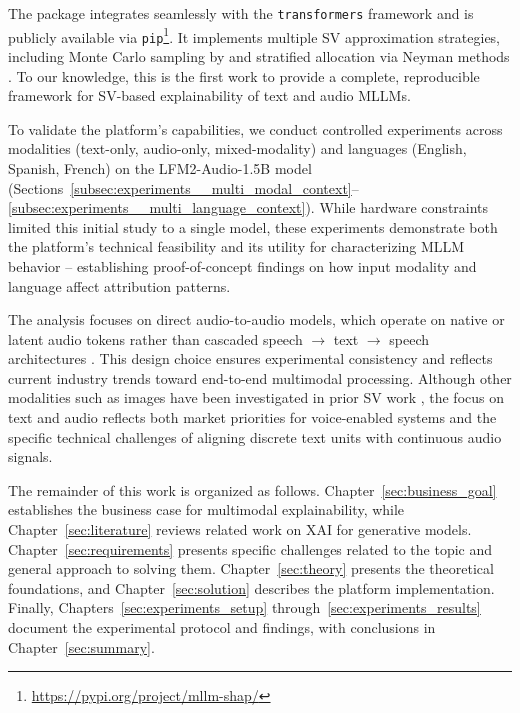 The package integrates seamlessly with the \texttt{transformers} framework \parencite{wolf2020transformers} and is publicly available via \texttt{pip}\footnote{\url{https://pypi.org/project/mllm-shap/}}. It implements multiple SV approximation strategies, including Monte Carlo sampling by \textcite{goldshmidt2024tokenshapinterpretinglargelanguage} and stratified allocation via Neyman methods \parencite{shapleyapproximations, nayman}. To our knowledge, this is the first work to provide a complete, reproducible framework for SV-based explainability of text and audio MLLMs.

To validate the platform's capabilities, we conduct controlled experiments across modalities (text-only, audio-only, mixed-modality) and languages (English, Spanish, French) on the LFM2-Audio-1.5B model (Sections~\ref{subsec:experiments__multi_modal_context}--\ref{subsec:experiments__multi_language_context}). While hardware constraints limited this initial study to a single model, these experiments demonstrate both the platform's technical feasibility and its utility for characterizing MLLM behavior -- establishing proof-of-concept findings on how input modality and language affect attribution patterns.

The analysis focuses on direct audio-to-audio models, which operate on native or latent audio tokens rather than cascaded speech $\rightarrow$ text $\rightarrow$ speech architectures \parencite{yang2025largelanguagemodelsmeet, Lee_2022}. This design choice ensures experimental consistency and reflects current industry trends toward end-to-end multimodal processing. Although other modalities such as images have been investigated in prior SV work \parencite{goldshmidt2024tokenshapinterpretinglargelanguage}, the focus on text and audio reflects both market priorities for voice-enabled systems and the specific technical challenges of aligning discrete text units with continuous audio signals.

The remainder of this work is organized as follows. Chapter~\ref{sec:business_goal} establishes the business case for multimodal explainability, while Chapter~\ref{sec:literature} reviews related work on XAI for generative models. Chapter~\ref{sec:requirements} presents specific challenges related to the topic and general approach to solving them. Chapter~\ref{sec:theory} presents the theoretical foundations, and Chapter~\ref{sec:solution} describes the platform implementation. Finally, Chapters~\ref{sec:experiments_setup} through~\ref{sec:experiments_results} document the experimental protocol and findings, with conclusions in Chapter~\ref{sec:summary}.


